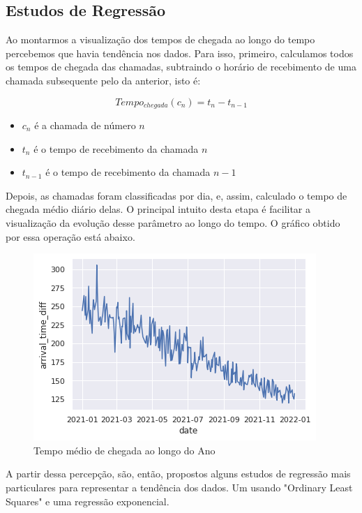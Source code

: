 \subsection{Estudos de Regressão}

Ao montarmos a visualização dos tempos de chegada ao longo do tempo percebemos que havia tendência nos dados. Para isso, primeiro, calculamos todos os tempos de chegada das chamadas, subtraindo o horário de recebimento de uma chamada subsequente pelo da anterior, isto é:

$$Tempo_{chegada}(c_n) = t_n - t_{n-1}$$ 

\begin{itemize}
    \item $c_n$ é a chamada de número $n$
    \item $t_n$ é o tempo de recebimento da chamada $n$
    \item $t_{n-1}$ é o tempo de recebimento da chamada $n-1$
\end{itemize}

Depois, as chamadas foram classificadas por dia, e, assim, calculado o tempo de chegada médio diário delas. O principal intuito desta etapa é facilitar a visualização da evolução desse parâmetro ao longo do tempo. O gráfico obtido por essa operação está abaixo.

\begin{figure}[H]
    \includegraphics{analise-de-dados/regressao/tempo_chegada_medio.png}
    \caption{Tempo médio de chegada ao longo do Ano}
    \label{fig: tempos_de_chegada}
\end{figure}

A partir dessa percepção, são, então, propostos alguns estudos de regressão mais particulares para representar a tendência dos dados. Um usando "Ordinary Least Squares" e uma regressão exponencial.  

